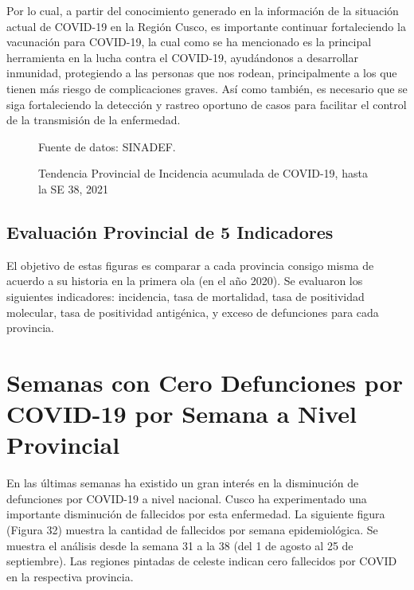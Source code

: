 \documentclass[12pt,a4paper,openany]{book}
\begin{document}
	Por lo cual, a partir del conocimiento generado en la información de la situación actual de COVID-19 en la Región Cusco, es importante continuar fortaleciendo la vacunación para COVID-19, la cual como se ha mencionado es la principal herramienta en la lucha contra el COVID-19, ayudándonos a desarrollar inmunidad, protegiendo a las personas que nos rodean, principalmente a los que tienen más riesgo de complicaciones graves. Así como también, es necesario que se siga fortaleciendo la detección y rastreo oportuno de casos para facilitar el control de la transmisión de la enfermedad.
	
	
	
	\begin{figure}[h]
		\caption{Tendencia Provincial de Incidencia acumulada de COVID-19, hasta la SE 38, 2021}\label{fig:mortalidad_provincias}
		\begin{center}
		\end{center}
		{\footnotesize {Fuente de datos: SINADEF.}}
	\end{figure}
	
	\newpage
	
	\section*{Evaluación Provincial de 5 Indicadores}
	\noindent El objetivo de estas figuras es comparar a cada provincia consigo misma de acuerdo a su historia  en la primera ola (en el año 2020). Se evaluaron los siguientes indicadores: incidencia, tasa de mortalidad, tasa de positividad molecular, tasa de positividad antigénica, y exceso de defunciones para cada provincia.
	
	\chapter*{Semanas con Cero Defunciones por COVID-19 por Semana a Nivel Provincial}
	\noindent En las últimas semanas ha existido un gran interés en la disminución de defunciones por COVID-19 a nivel nacional. Cusco ha experimentado una importante disminución de fallecidos por esta enfermedad.  La siguiente figura (Figura 32) muestra la cantidad de fallecidos por semana epidemiológica. Se muestra el análisis desde la semana 31 a la 38 (del 1 de agosto al 25 de septiembre). Las regiones pintadas de celeste indican cero fallecidos por COVID en la respectiva provincia.
	
\end{document}
